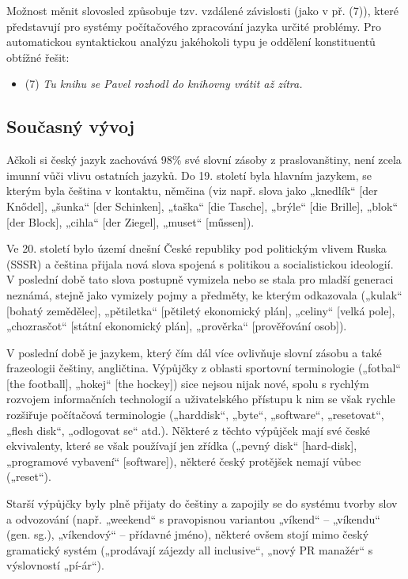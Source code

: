 \documentclass[]{../../metanetpaper}
\begin{document}
\begin{multicols}{2}
Možnost měnit slovosled způsobuje tzv. vzdálené závislosti (jako v př. (7)), které představují pro systémy počítačového zpracování jazyka určité problémy. Pro automatickou syntaktickou analýzu jakéhokoli typu je oddělení konstituentů obtížné řešit:
\begin{itemize}
\item[] (7)	\textit{Tu knihu se Pavel rozhodl do knihovny vrátit až zítra.}
\end{itemize}

\subsection{Současný vývoj}

Ačkoli si český jazyk zachovává 98\% své slovní zásoby z praslovanštiny, není zcela imunní vůči vlivu ostatních jazyků.\cite{Note5} Do 19. století byla hlavním jazykem, se kterým byla čeština v kontaktu, němčina (viz např. slova jako „knedlík“ {[}der Knődel{]}, „šunka“ {[}der Schinken{]}, „taška“ {[}die Tasche{]}, „brýle“ {[}die Brille{]}, „blok“ {[}der Block{]}, „cihla“ {[}der Ziegel{]}, „muset“ {[}műssen{]}).

Ve 20. století bylo území dnešní České republiky pod politickým vlivem Ruska (SSSR) a čeština přijala nová slova spojená s politikou a socialistickou ideologií. V poslední době tato slova postupně vymizela nebo se stala pro mladší generaci neznámá, stejně jako vymizely pojmy a předměty, ke kterým odkazovala („kulak“ {[}bohatý zemědělec{]}, „pětiletka“ {[}pětiletý ekonomický plán{]}, „celiny“ {[}velká pole{]}, „chozrasčot“ {[}státní ekonomický plán{]}, „prověrka“ {[}prověřování osob{]}).

V poslední době je jazykem, který čím dál více ovlivňuje slovní zásobu a také frazeologii češtiny, angličtina. Výpůjčky z oblasti sportovní terminologie („fotbal“ {[}the football{]}, „hokej“ {[}the hockey{]}) sice nejsou nijak nové, spolu s rychlým rozvojem informačních technologií a uživatelského přístupu k nim se však rychle rozšiřuje počítačová terminologie („harddisk“, „byte“, „software“, „resetovat“, „flesh disk“, „odlogovat se“ atd.). Některé z těchto výpůjček mají své české ekvivalenty, které se však používají jen zřídka („pevný disk“ {[}hard-disk{]}, „programové vybavení“ {[}software{]}), některé český protějšek nemají vůbec („reset“).

Starší výpůjčky byly plně přijaty do češtiny a zapojily se do systému tvorby slov a odvozování (např. „weekend“ s pravopisnou variantou „víkend“ – „víkendu“ (gen. sg.), „víkendový“ – přídavné jméno), některé ovšem stojí mimo český gramatický systém („prodávají zájezdy all inclusive“, „nový PR manažér“ s výslovností „pí-ár“).


\end{multicols}
\end{document}
